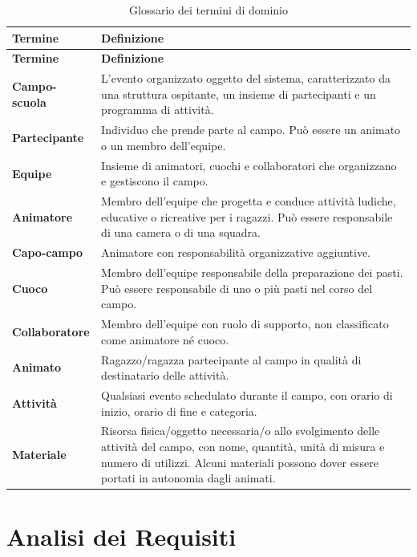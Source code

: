 \documentclass[11pt,a4paper]{article}
\begin{document}
\begin{longtable}{@{}p{}p{}@{}}
\caption{Glossario dei termini di dominio}\label{tab:glossario}\\
\toprule
\textbf{Termine} & \textbf{Definizione} \\
\midrule
\endfirsthead
\toprule
\textbf{Termine} & \textbf{Definizione} \\
\midrule
\endhead
\bottomrule
\endfoot
\textbf{Campo-scuola} & L'evento organizzato oggetto del sistema, caratterizzato da una struttura
  ospitante, un insieme di partecipanti e un programma di attività. \\
\textbf{Partecipante} & Individuo che prende parte al campo. Può essere un animato o un membro
  dell'equipe. \\
\textbf{Equipe} & Insieme di animatori, cuochi e collaboratori che organizzano e gestiscono il
  campo. \\
\textbf{Animatore} & Membro dell'equipe che progetta e conduce attività ludiche, educative o
  ricreative per i ragazzi. Può essere responsabile di una camera o di una squadra. \\
\textbf{Capo-campo} & Animatore con responsabilità organizzative aggiuntive. \\
\textbf{Cuoco} & Membro dell'equipe responsabile della preparazione dei pasti. Può essere
  responsabile di uno o più pasti nel corso del campo. \\
\textbf{Collaboratore} & Membro dell'equipe con ruolo di supporto, non classificato come
  animatore né cuoco. \\
\textbf{Animato} & Ragazzo/ragazza partecipante al campo in qualità di destinatario delle
  attività. \\
\textbf{Attività} & Qualsiasi evento schedulato durante il campo, con orario di inizio, orario di
  fine e categoria. \\
\textbf{Materiale} & Risorsa fisica/oggetto necessaria/o allo svolgimento delle attività del
  campo, con nome, quantità, unità di misura e numero di utilizzi. Alcuni materiali possono dover
  essere portati in autonomia dagli animati. \\
\end{longtable}


\section{Analisi dei Requisiti}
\end{document}
